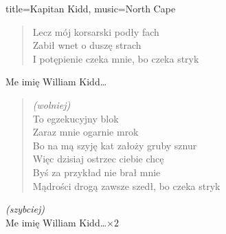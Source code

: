 \begin{song}{title={Kapitan Kidd}, music={North Cape}}
\begin{multicols}{2}
\begin{verse}
        Lecz mój korsarski podły fach \\
        Zabił wnet o duszę strach \\
        I potępienie czeka mnie, bo czeka stryk
    \end{verse}
    \begin{chorus}
        Me imię William Kidd\ldots
    \end{chorus}
    \begin{verse}
        \textit{(wolniej)} \\
        To egzekucyjny blok \\
        Zaraz mnie ogarnie mrok \\
        Bo na mą szyję kat założy gruby sznur \\
        Więc dzisiaj ostrzec ciebie chcę \\
        Byś za przykład nie brał mnie \\
        Mądrości drogą zawsze szedł, bo czeka stryk
    \end{verse}
    \begin{chorus}
        \textit{(szybciej)} \\
        Me imię William Kidd\ldots $\times 2$
    \end{chorus}
\end{multicols}
\end{song}
\newpage
